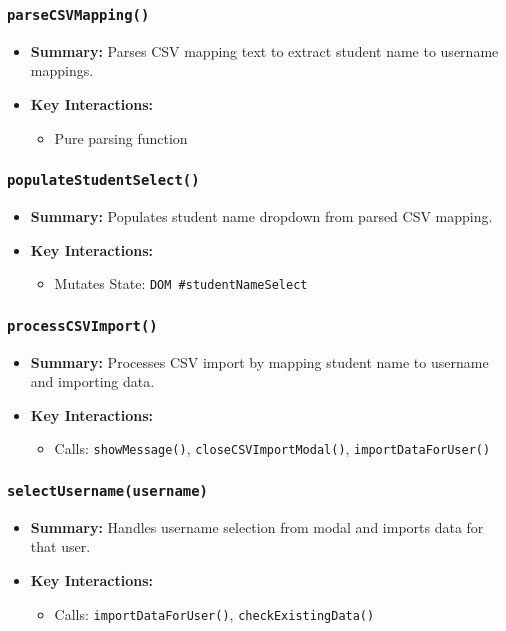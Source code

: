 \documentclass[11pt,letterpaper]{article}
\begin{document}
\subsubsection{\texttt{parseCSVMapping()}}
\begin{itemize}
    \item \textbf{Summary:} Parses CSV mapping text to extract student name to username mappings.
    \item \textbf{Key Interactions:}
    \begin{itemize}
        \item Pure parsing function
    \end{itemize}
\end{itemize}

\subsubsection{\texttt{populateStudentSelect()}}
\begin{itemize}
    \item \textbf{Summary:} Populates student name dropdown from parsed CSV mapping.
    \item \textbf{Key Interactions:}
    \begin{itemize}
        \item Mutates State: \texttt{DOM \#studentNameSelect}
    \end{itemize}
\end{itemize}

\subsubsection{\texttt{processCSVImport()}}
\begin{itemize}
    \item \textbf{Summary:} Processes CSV import by mapping student name to username and importing data.
    \item \textbf{Key Interactions:}
    \begin{itemize}
        \item Calls: \texttt{showMessage()}, \texttt{closeCSVImportModal()}, \texttt{importDataForUser()}
    \end{itemize}
\end{itemize}

\subsubsection{\texttt{selectUsername(username)}}
\begin{itemize}
    \item \textbf{Summary:} Handles username selection from modal and imports data for that user.
    \item \textbf{Key Interactions:}
    \begin{itemize}
        \item Calls: \texttt{importDataForUser()}, \texttt{checkExistingData()}
    \end{itemize}
\end{itemize}
\end{document}
